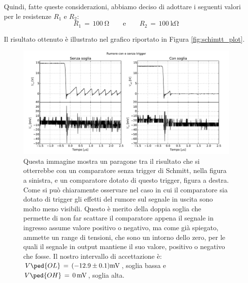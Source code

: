 Quindi, fatte queste considerazioni, abbiamo deciso di adottare i seguenti valori per le resistenze $R_1$ e $R_2$:
\begin{equation}
        R_1\,=\,\SI{100}{\ohm} \qquad \text{e} \qquad R_2\,=\,\SI{100}{\kilo\ohm}
\end{equation}

Il risultato ottenuto è illustrato nel grafico riportato in Figura \ref{fig:schimtt_plot}.

\begin{figure}[H]
    \includegraphics[width=\textwidth]{figure/trigger_graph.pdf}
    \caption{Questa immagine mostra un paragone tra il risultato che si otterrebbe con un comparatore senza trigger di Schmitt, nella figura a sinistra, e un comparatore dotato di questo trigger, figura a destra. Come si può chiaramente osservare nel caso in cui il comparatore sia dotato di trigger gli effetti del rumore sul segnale in uscita sono molto meno visibili. Questo è merito della doppia soglia che permette di non far scattare il comparatore appena il segnale in ingresso assume valore positivo o negativo, ma come già spiegato, ammette un range di tensioni, che sono un intorno dello zero, per le quali il segnale in output mantiene il suo valore, positivo o negativo che fosse. Il nostro intervallo di accettazione è:$V\ped{OL}\,=\,(-12.9\pm0.1)\SI{}{\milli\volt}$, soglia bassa e $V\ped{OH}\,=\,\SI{0}{\milli\volt}$, soglia alta.}
    \label{fig:schmitt_plot}
\end{figure}

